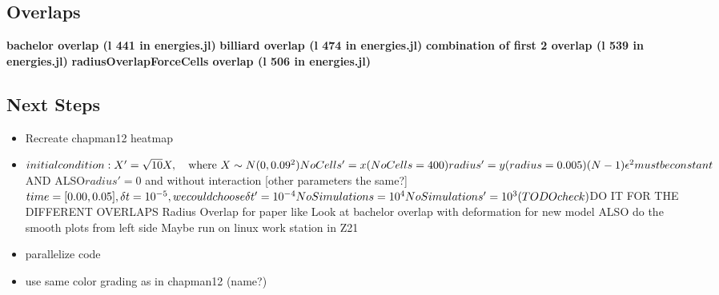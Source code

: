 \newpage
\subsection*{Overlaps}
\textbf{bachelor overlap (l 441 in energies.jl)}
\textbf{billiard overlap (l 474 in energies.jl)}
\textbf{combination of first 2 overlap  (l 539 in energies.jl)}
\textbf{radiusOverlapForceCells overlap (l 506 in energies.jl)}

\newpage
\subsection*{Next Steps}
\begin{itemize}
	\item Recreate chapman12 heatmap 
	
	\item 
	$


	initial condition: X' = \sqrt{10} X , \quad \text{where } X \sim N(0, 0.09^2)  \\
	
	NoCells' = x (NoCells = 400) \\
	radius' = y (radius = 0.005) \\
	(N-1) \epsilon ^2 must be constant 
	$AND ALSO$ radius' = 0 $ and without interaction [other parameters the same?] $

	time = [0.00,0.05], \delta t = 10^{-5}, we could choose \delta t' = 10^{-4} \\
	NoSimulations = 10^4 \\
	NoSimulations' = 10^3 (TODO check) \\


	$DO IT FOR THE DIFFERENT OVERLAPS 
	Radius Overlap for paper like Look at 
	bachelor overlap with deformation for new model $
	$ALSO do the smooth plots from left side  $
	$Maybe run on linux work station in Z21$

	$
	\item parallelize code 
	\item use same color grading as in chapman12 (name?)

\end{itemize} 


